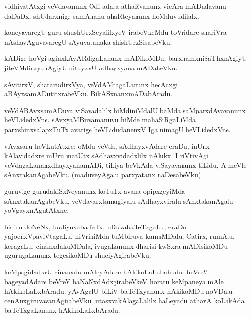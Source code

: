 \documentclass{article}
\begin{document}
\begin{mn}
vidhivatAtxgi veVdavanunx Odi adara athaRvanunx vicAra mADadavanu daDaDx, shUdarxnige samAnanu
ahaRteyanunx hoMduvudilalx.
\end{mn}

\begin{mn}
koneyavaregU guru shushUrxSeyalilxyeV irabeVkeMdu toVridare shariVra nAshavAguvavaregU 
sAyuvatanaka shishUrxSisabeVku.
\end{mn}

\begin{mn}
kADige hoVgi aginxkAyARdigaLanunx mADikoMDu, barxhamxniSaThxnAgiyU jiteVMdirxyanAgiyU nitayxvU 
adhayxyana mADabeVku.
\end{mn}

\begin{mn}
sAvitirxV, shatarudirxVya, veVdAMtagaLanunx hecAcxgi aBAyxsamADutitxrabeVku. BikASxnanxmADabAradu.
\end{mn}

\begin{mn}
veVdABAyxsamADuva viSayadalilx hiMdiniMdalU baMda saMparxdAyavanunx  heVLidedxVne. 
sAvxyaMBuvamanuvu hiMde mahaSiRgaLiMda parxshinxsalapxTuTx avarige heVLidudanenxV Iga nimagU 
heVLidedxVne.
\end{mn}


\begin{mn}
vAyxsaru heVLutAtxre: oMdu veVda, sAdhayxvAdare eraDu, inUnx kAlavidadxre mUru matUtx 
sAdhayxvidadxlilx nAlukx. I riVtiyAgi veVdagaLananxdhayxyanamADi, tiLiya beVkAda viSayavanunx 
tiLidu, A meVle sAnxtakanAgabeVku. (maduveyAgalu parxyatanx naDesabeVku).
\end{mn}

\begin{mn}
guruvige gurudakiSxNeyanunx koTuTx avana opipxgeyiMda sAnxtakanAgabeVku. veVdavarxtamugiyalu 
sAdhayxviralu sAnxtakanAgalu yoVgayxnAgutAtxne. 
\end{mn}

\begin{mn}
bidiru doNeNx, hodiyuvabaTeTx, uDuvabaTeTxgaLu, eraDu yajocnxVpaviVtagaLu, niVriniMda tuMbiruva 
kamaMDalu, Catirx, rumAlu, keragaLu, cinanxdakuMDala, ivugaLanunx dharisi kwSxra mADisikoMDu 
ugurugaLanunx tegesikoMDu shuciyAgirabeVku.
\end{mn}

\begin{mn}
keMpagidadxrU cinanxda mAleyAdare hAkikoLaLxbahudu. beVreV bageyadAdare beVreV 
baNaNxdAdxgirabeVkeV horatu keMpaneya mAle hAkikoLaLxbAradu. yAvAgalU biLiV baTeTxyanunx 
hAkikoMDu noVDalu cenAnxgiruvavanAgirabeVku. utasxvakAlagaLalilx haLeyadu athavA koLakAda 
baTeTxgaLanunx hAkikoLaLxbAradu. 
\end{mn}
\end{document}
